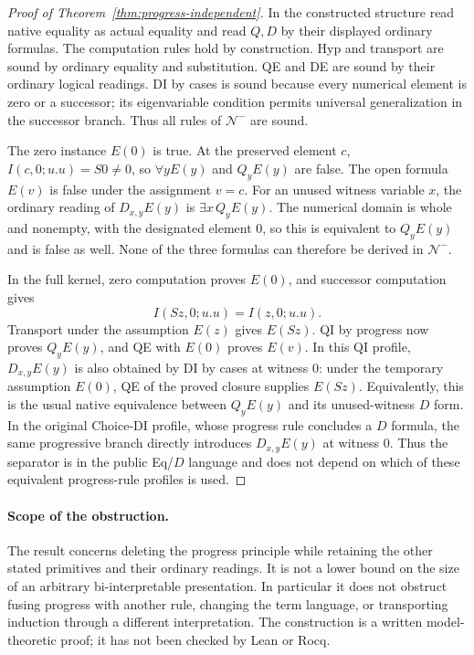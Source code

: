 \begin{proof}[Proof of Theorem~\ref{thm:progress-independent}]
In the constructed structure read native equality as actual equality
and read $Q,D$ by their displayed ordinary formulas.  The computation
rules hold by construction.  Hyp and transport are sound by ordinary
equality and substitution.  QE and DE are sound by their ordinary
logical readings.  DI by cases is sound because every numerical
element is zero or a successor; its eigenvariable condition permits
universal generalization in the successor branch.  Thus all rules of
$\mathcal N^{-}$ are sound.

The zero instance $E(0)$ is true.  At the preserved element $c$,
$I(c,0;u.u)=S0\ne0$, so $\forall y E(y)$ and $Q_yE(y)$ are false.
The open formula $E(v)$ is false under the assignment $v=c$.
For an unused witness variable $x$, the ordinary reading of
$D_{x,y}E(y)$ is $\exists x\,Q_yE(y)$.  The numerical domain is
whole and nonempty, with the designated element $0$, so this is
equivalent to $Q_yE(y)$ and is false as well.  None of the three
formulas can therefore be derived in $\mathcal N^{-}$.

In the full kernel, zero computation proves $E(0)$, and successor
computation gives
\[
 I(Sz,0;u.u)=I(z,0;u.u).
\]
Transport under the assumption $E(z)$ gives $E(Sz)$.  QI by progress
now proves $Q_yE(y)$, and QE with $E(0)$ proves $E(v)$.
In this QI profile, $D_{x,y}E(y)$ is also obtained by DI by cases
at witness $0$: under the temporary assumption $E(0)$, QE of the
proved closure supplies $E(Sz)$.  Equivalently, this is the usual
native equivalence between $Q_yE(y)$ and its unused-witness $D$
form.  In the original Choice-DI profile, whose progress rule
concludes a $D$ formula, the same progressive branch directly
introduces $D_{x,y}E(y)$ at witness $0$.  Thus the separator is in
the public Eq/$D$ language and does not depend on which of these
equivalent progress-rule profiles is used.
\end{proof}

\paragraph{Scope of the obstruction.}
The result concerns deleting the progress principle while retaining
the other stated primitives and their ordinary readings.  It is not
a lower bound on the size of an arbitrary bi-interpretable
presentation.  In particular it does not obstruct fusing progress
with another rule, changing the term language, or transporting
induction through a different interpretation.  The construction is
a written model-theoretic proof; it has not been checked by Lean or
Rocq.

